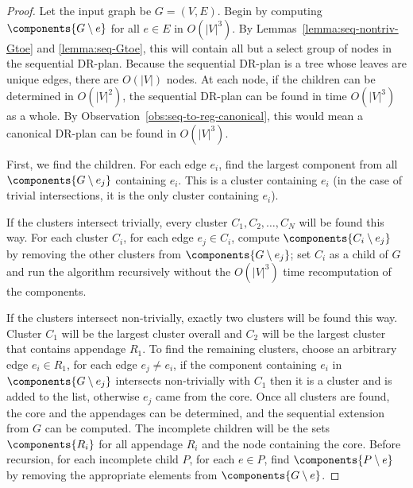 \begin{proof}
    Let the input graph be $G=(V,E)$. Begin by computing $\components{G\setminus e}$ for all $e\in E$ in $O(|V|^3)$. By Lemmas~\ref{lemma:seq-nontriv-Gtoe} and \ref{lemma:seq-Gtoe}, this will contain all but a select group of nodes in the sequential DR-plan. Because the sequential DR-plan is a tree whose leaves are unique edges, there are $O(|V|)$ nodes. At each node, if the children can be determined in $O(|V|^2)$, the sequential DR-plan can be found in time $O(|V|^3)$ as a whole. By Observation~\ref{obs:seq-to-reg-canonical}, this would mean a canonical DR-plan can be found in $O(|V|^3)$.

    First, we find the children. For each edge $e_i$, find the largest component from all $\components{G\setminus e_j}$ containing $e_i$. This is a cluster containing $e_i$ (in the case of trivial intersections, it is the only cluster containing $e_i$).

    If the clusters intersect trivially, every cluster $C_1, C_2, \ldots, C_N$ will be found this way. For each cluster $C_i$, for each edge $e_j\in C_i$, compute $\components{C_i\setminus e_j}$ by removing the other clusters from $\components{G\setminus e_j}$; set $C_i$ as a child of $G$ and run the algorithm recursively without the $O(|V|^3)$ time recomputation of the components.

    If the clusters intersect non-trivially, exactly two clusters will be found this way. Cluster $C_1$ will be the largest cluster overall and $C_2$ will be the largest cluster that contains appendage $R_1$. To find the remaining clusters, choose an arbitrary edge $e_i\in R_1$, for each edge $e_j\neq e_i$, if the component containing $e_i$ in $\components{G\setminus e_j}$ intersects non-trivially with $C_1$ then it is a cluster and is added to the list, otherwise $e_j$ came from the core. Once all clusters are found, the core and the appendages can be determined, and the sequential extension from $G$ can be computed. The incomplete children will be the sets $\components{R_i}$ for all appendage $R_i$ and the node containing the core. Before recursion, for each incomplete child $P$, for each $e\in P$, find $\components{P\setminus e}$ by removing the appropriate elements from $\components{G\setminus e}$.
\end{proof}


